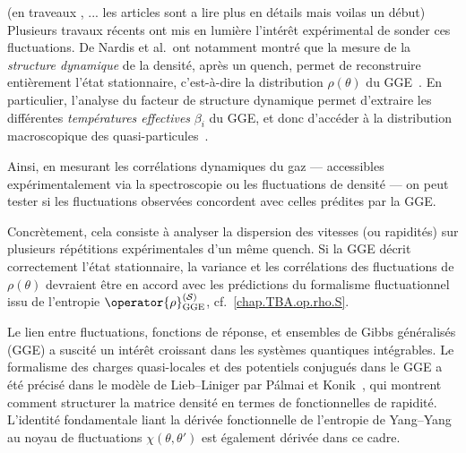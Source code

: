 {\color{blue} { \color{red} (en traveaux , ... les articles sont a lire plus en détails mais voilas un début)} 
\medskip
Plusieurs travaux récents ont mis en lumière l’intérêt expérimental de sonder ces fluctuations. De Nardis et al.\ ont notamment montré que la mesure de la \textit{structure dynamique} de la densité, après un quench, permet de reconstruire entièrement l’état stationnaire, c’est-à-dire la distribution \( \rho(\theta) \) du GGE~\cite{DeNardis2017}. En particulier, l’analyse du facteur de structure dynamique permet d’extraire les différentes \textit{températures effectives} \( \beta_i \) du GGE, et donc d’accéder à la distribution macroscopique des quasi-particules~\cite{Goldstein2013,CauxKonik2012}.

\medskip
Ainsi, en mesurant les corrélations dynamiques du gaz — accessibles expérimentalement via la spectroscopie ou les fluctuations de densité — on peut tester si les fluctuations observées concordent avec celles prédites par la GGE.

\medskip
Concrètement, cela consiste à analyser la dispersion des vitesses (ou rapidités) sur plusieurs répétitions expérimentales d’un même quench. Si la GGE décrit correctement l’état stationnaire, la variance et les corrélations des fluctuations de \( \rho(\theta) \) devraient être en accord avec les prédictions du formalisme fluctuationnel issu de l’entropie \( \operator{\rho}^{(\mathcal{S})}_{\mathrm{GGE}} \), cf.~\eqref{chap.TBA.op.rho.S}.

\medskip
Le lien entre fluctuations, fonctions de réponse, et ensembles de Gibbs généralisés (GGE) a suscité un intérêt croissant dans les systèmes quantiques intégrables. Le formalisme des charges quasi-locales et des potentiels conjugués dans le GGE a été précisé dans le modèle de Lieb–Liniger par Pálmai et Konik~\cite{Palmai2018}, qui montrent comment structurer la matrice densité en termes de fonctionnelles de rapidité. L'identité fondamentale liant la dérivée fonctionnelle de l'entropie de Yang–Yang au noyau de fluctuations $\chi(\theta,\theta')$ est également dérivée dans ce cadre.

}
